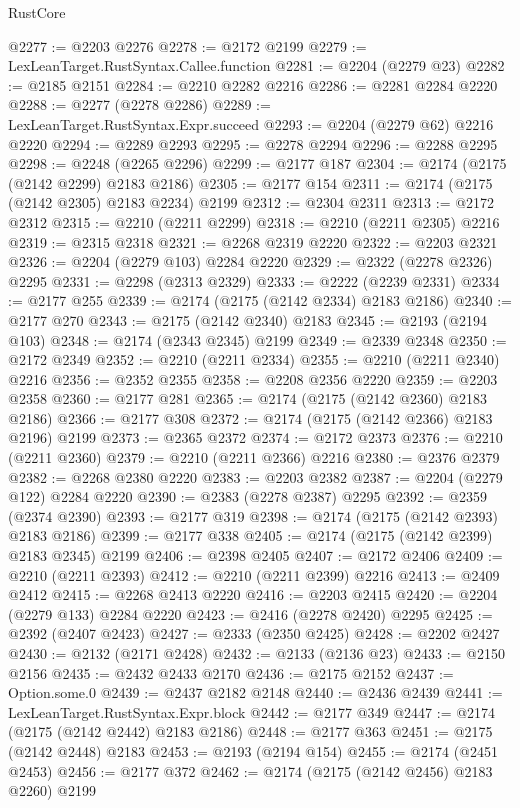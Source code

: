 \begin{lexlean}{RustCore}
\begin{coremodule}
@2277 := @2203 @2276
@2278 := @2172 @2199
@2279 := LexLeanTarget.RustSyntax.Callee.function
@2281 := @2204 (@2279 @23)
@2282 := @2185 @2151
@2284 := @2210 @2282 @2216
@2286 := @2281 @2284 @2220
@2288 := @2277 (@2278 @2286)
@2289 := LexLeanTarget.RustSyntax.Expr.succeed
@2293 := @2204 (@2279 @62) @2216 @2220
@2294 := @2289 @2293
@2295 := @2278 @2294
@2296 := @2288 @2295
@2298 := @2248 (@2265 @2296)
@2299 := @2177 @187
@2304 := @2174 (@2175 (@2142 @2299) @2183 @2186)
@2305 := @2177 @154
@2311 := @2174 (@2175 (@2142 @2305) @2183 @2234) @2199
@2312 := @2304 @2311
@2313 := @2172 @2312
@2315 := @2210 (@2211 @2299)
@2318 := @2210 (@2211 @2305) @2216
@2319 := @2315 @2318
@2321 := @2268 @2319 @2220
@2322 := @2203 @2321
@2326 := @2204 (@2279 @103) @2284 @2220
@2329 := @2322 (@2278 @2326) @2295
@2331 := @2298 (@2313 @2329)
@2333 := @2222 (@2239 @2331)
@2334 := @2177 @255
@2339 := @2174 (@2175 (@2142 @2334) @2183 @2186)
@2340 := @2177 @270
@2343 := @2175 (@2142 @2340) @2183
@2345 := @2193 (@2194 @103)
@2348 := @2174 (@2343 @2345) @2199
@2349 := @2339 @2348
@2350 := @2172 @2349
@2352 := @2210 (@2211 @2334)
@2355 := @2210 (@2211 @2340) @2216
@2356 := @2352 @2355
@2358 := @2208 @2356 @2220
@2359 := @2203 @2358
@2360 := @2177 @281
@2365 := @2174 (@2175 (@2142 @2360) @2183 @2186)
@2366 := @2177 @308
@2372 := @2174 (@2175 (@2142 @2366) @2183 @2196) @2199
@2373 := @2365 @2372
@2374 := @2172 @2373
@2376 := @2210 (@2211 @2360)
@2379 := @2210 (@2211 @2366) @2216
@2380 := @2376 @2379
@2382 := @2268 @2380 @2220
@2383 := @2203 @2382
@2387 := @2204 (@2279 @122) @2284 @2220
@2390 := @2383 (@2278 @2387) @2295
@2392 := @2359 (@2374 @2390)
@2393 := @2177 @319
@2398 := @2174 (@2175 (@2142 @2393) @2183 @2186)
@2399 := @2177 @338
@2405 := @2174 (@2175 (@2142 @2399) @2183 @2345) @2199
@2406 := @2398 @2405
@2407 := @2172 @2406
@2409 := @2210 (@2211 @2393)
@2412 := @2210 (@2211 @2399) @2216
@2413 := @2409 @2412
@2415 := @2268 @2413 @2220
@2416 := @2203 @2415
@2420 := @2204 (@2279 @133) @2284 @2220
@2423 := @2416 (@2278 @2420) @2295
@2425 := @2392 (@2407 @2423)
@2427 := @2333 (@2350 @2425)
@2428 := @2202 @2427
@2430 := @2132 (@2171 @2428)
@2432 := @2133 (@2136 @23)
@2433 := @2150 @2156
@2435 := @2432 @2433 @2170
@2436 := @2175 @2152
@2437 := Option.some.{0}
@2439 := @2437 @2182 @2148
@2440 := @2436 @2439
@2441 := LexLeanTarget.RustSyntax.Expr.block
@2442 := @2177 @349
@2447 := @2174 (@2175 (@2142 @2442) @2183 @2186)
@2448 := @2177 @363
@2451 := @2175 (@2142 @2448) @2183
@2453 := @2193 (@2194 @154)
@2455 := @2174 (@2451 @2453)
@2456 := @2177 @372
@2462 := @2174 (@2175 (@2142 @2456) @2183 @2260) @2199

\end{coremodule}
\end{lexlean}
